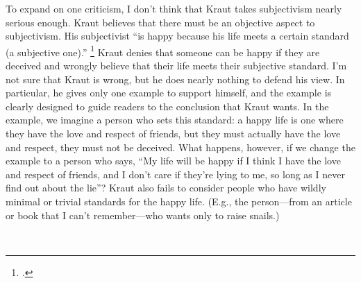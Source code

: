 \documentclass[12pt,letterpaper]{article}
\begin{document}
To expand on one criticism, I don't think that Kraut takes subjectivism nearly serious enough.
Kraut believes that there must be an objective aspect to subjectivism.
His subjectivist ``is happy because his life meets a certain standard (a subjective one).''%
\footcite[][168]{two-conceptions-of-happiness-kraut-1979}
Kraut denies that someone can be happy if they are deceived and wrongly believe that their life meets their subjective standard.
I'm not sure that Kraut is wrong, but he does nearly nothing to defend his view.
In particular, he gives only one example to support himself, and the example is clearly designed to guide readers to the conclusion that Kraut wants.
In the example, we imagine a person who sets this standard: a happy life is one where they have the love and respect of friends, but they must actually have the love and respect, they must not be deceived.
What happens, however, if we change the example to a person who says, ``My life will be happy if I think I have the love and respect of friends, and I don't care if they're lying to me, so long as I never find out about the lie''?
Kraut also fails to consider people who have wildly minimal or trivial standards for the happy life.
(E.g., the person---from an article or book that I can't remember---who wants only to raise snails.)

\newpage\
\pagestyle{references}
\printbibliography[title={Bibliography}]
\end{document}

